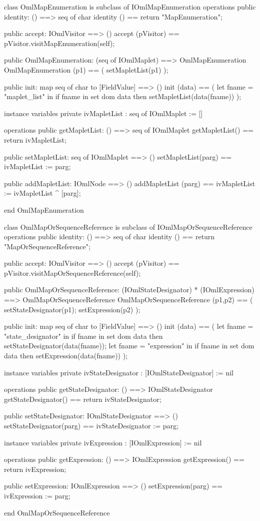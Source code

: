 \begin{vdm_al}
class OmlMapEnumeration is subclass of IOmlMapEnumeration
operations
  public identity: () ==> seq of char
  identity () == return "MapEnumeration";

  public accept: IOmlVisitor ==> ()
  accept (pVisitor) == pVisitor.visitMapEnumeration(self);

  public OmlMapEnumeration:
      (seq of IOmlMaplet) ==> OmlMapEnumeration
  OmlMapEnumeration (p1) == 
   ( setMapletList(p1) );

  public init: map seq of char to [FieldValue] ==> ()
  init (data) ==
    ( let fname = "maplet_list" in
        if fname in set dom data
        then setMapletList(data(fname)) );

instance variables
  private ivMapletList : seq of IOmlMaplet := []

operations
  public getMapletList: () ==> seq of IOmlMaplet
  getMapletList() == return ivMapletList;

  public setMapletList: seq of IOmlMaplet ==> ()
  setMapletList(parg) == ivMapletList := parg;

  public addMapletList: IOmlNode ==> ()
  addMapletList (parg) == ivMapletList := ivMapletList ^ [parg];

end OmlMapEnumeration
\end{vdm_al}

\begin{vdm_al}
class OmlMapOrSequenceReference is subclass of IOmlMapOrSequenceReference
operations
  public identity: () ==> seq of char
  identity () == return "MapOrSequenceReference";

  public accept: IOmlVisitor ==> ()
  accept (pVisitor) == pVisitor.visitMapOrSequenceReference(self);

  public OmlMapOrSequenceReference:
      (IOmlStateDesignator) *
      (IOmlExpression) ==> OmlMapOrSequenceReference
  OmlMapOrSequenceReference (p1,p2) == 
   ( setStateDesignator(p1);
     setExpression(p2) );

  public init: map seq of char to [FieldValue] ==> ()
  init (data) ==
    ( let fname = "state_designator" in
        if fname in set dom data
        then setStateDesignator(data(fname));
      let fname = "expression" in
        if fname in set dom data
        then setExpression(data(fname)) );

instance variables
  private ivStateDesignator : [IOmlStateDesignator] := nil

operations
  public getStateDesignator: () ==> IOmlStateDesignator
  getStateDesignator() == return ivStateDesignator;

  public setStateDesignator: IOmlStateDesignator ==> ()
  setStateDesignator(parg) == ivStateDesignator := parg;

instance variables
  private ivExpression : [IOmlExpression] := nil

operations
  public getExpression: () ==> IOmlExpression
  getExpression() == return ivExpression;

  public setExpression: IOmlExpression ==> ()
  setExpression(parg) == ivExpression := parg;

end OmlMapOrSequenceReference
\end{vdm_al}

